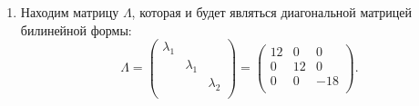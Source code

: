 \documentclass[a4paper]{article}
\begin{document}
\begin{solution}
\begin{enumerate}[label=\arabic*)]
\begin{itemize}
            \item[$\pmb{\lambda_2 = -18}$]
                Находим ФСР:
                \begin{equation*}
                    \begin{amatrix}{3}{1}
                        25 & -5 & 10 & 0 \\
                        -5 & 25 & 10 & 0 \\
                        10 & 10 & 10 & 0 \\
                    \end{amatrix}
                    \to
                    \begin{amatrix}{3}{1}
                        1 & 1 & 1 & 0 \\
                        0 & -6 & -3 & 0 \\
                        0 & 2 & 1 & 0 \\
                    \end{amatrix}
                    \to
                    \begin{amatrix}{3}{1}
                        1 & 0 & -1/2 & 0 \\
                        0 & 1 & 1/2 & 0 \\
                        0 & 0 & 0 & 0 \\
                    \end{amatrix}.
                \end{equation*}

                Найденная система состоит из одного вектора $f_1 = \left(1, -1, 2\right)$. Отнормируем его:
                \begin{equation*}
                    f_1 \to \dfrac{1}{\sqrt{6}}(1, -1, 2).
                \end{equation*}
            \end{itemize}

        \item
            Находим матрицу $\Lambda$, которая и будет являться диагональной матрицей билинейной формы:
            \begin{equation*}
                \Lambda
                = \begin{pmatrix}
                    \lambda_1 & & \\
                     & \lambda_1 & \\
                     &  & \lambda_2 \\
                \end{pmatrix}
                = \begin{pmatrix}
                    12 & 0 & 0 \\
                    0 & 12 & 0 \\
                    0 & 0 & -18 \\
                \end{pmatrix}.
            \end{equation*}


\end{enumerate}
\end{solution}
\end{document}
